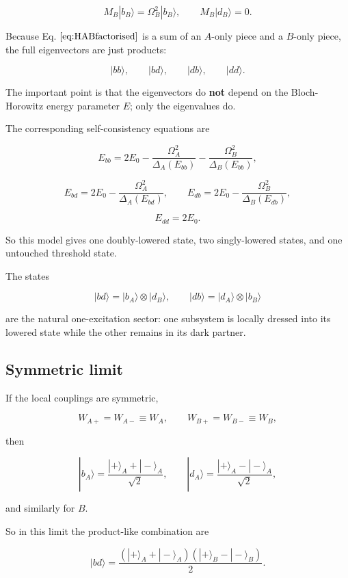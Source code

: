 \documentclass[
]{article}
\renewcommand{\[}{\begin{equation}}
\renewcommand{\]}{\end{equation}}
\begin{document}
\[
M_B|b_B\rangle=\Omega_B^2|b_B\rangle,
\qquad
M_B|d_B\rangle=0.
\label{eq:MBeig}
\]

Because Eq. \(\ref{eq:HABfactorised}\) is a sum of an \(A\)-only piece
and a \(B\)-only piece, the full eigenvectors are just products:

\[
|bb\rangle,\qquad |bd\rangle,\qquad |db\rangle,\qquad |dd\rangle.
\label{eq:ABproductStates}
\]

The important point is that the eigenvectors do \textbf{not} depend on
the Bloch-Horowitz energy parameter \(E\); only the eigenvalues do.

The corresponding self-consistency equations are

\[
E_{bb} =
2E_0 -
\frac{\Omega_A^2}{\Delta_A(E_{bb})} -
\frac{\Omega_B^2}{\Delta_B(E_{bb})},
\label{eq:EbbSelf}
\]

\[
E_{bd} =
2E_0 -
\frac{\Omega_A^2}{\Delta_A(E_{bd})},
\qquad
E_{db} =
2E_0 -
\frac{\Omega_B^2}{\Delta_B(E_{db})},
\label{eq:EbdEdbSelf}
\]

\[
E_{dd}=2E_0.
\label{eq:EddSelf}
\]

So this model gives one doubly-lowered state, two singly-lowered states,
and one untouched threshold state.

The states

\[
|bd\rangle=|b_A\rangle\otimes|d_B\rangle,
\qquad
|db\rangle=|d_A\rangle\otimes|b_B\rangle
\label{eq:oneExcitationSector}
\]

are the natural one-excitation sector: one subsystem is locally dressed
into its lowered state while the other remains in its dark partner.

\subsection{Symmetric limit}\label{symmetric-limit}

If the local couplings are symmetric,

\[
W_{A+}=W_{A-}\equiv W_A,
\qquad
W_{B+}=W_{B-}\equiv W_B,
\label{eq:symmetricAB}
\]

then

\[
|b_A\rangle=\frac{|+\rangle_A+|-\rangle_A}{\sqrt2},
\qquad
|d_A\rangle=\frac{|+\rangle_A-|-\rangle_A}{\sqrt2},
\label{eq:symmetricABstatesA}
\]

and similarly for \(B\).

So in this limit the product-like combination are

\[
|bd\rangle =
\frac{(|+\rangle_A+|-\rangle_A)(|+\rangle_B-|-\rangle_B)}{2}.
\label{eq:bdExample}
\]
\end{document}
